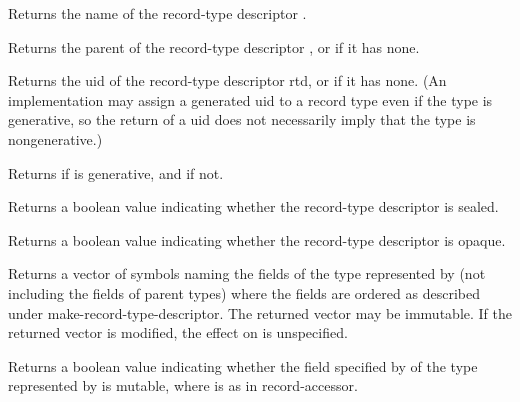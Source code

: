 \begin{entry}{%
}
   
Returns the name of the record-type descriptor .
\end{entry}   

\begin{entry}{%
}
   
Returns the parent of the record-type descriptor , or
\schfalse{} if it has none.
\end{entry}

\begin{entry}{%
}
   
Returns the uid of the record-type descriptor rtd, or \schfalse{} if it has none.
(An implementation may assign a generated uid to a record type even if the
type is generative, so the return of a uid does not necessarily imply that
the type is nongenerative.)
\end{entry}

\begin{entry}{%
}
   
Returns \schtrue{} if  is generative, and \schfalse{} if not.
\end{entry}

\begin{entry}{%
}

Returns a boolean value indicating whether the record-type descriptor is
sealed.
\end{entry}

\begin{entry}{%
}
   
Returns a boolean value indicating whether the record-type descriptor is
opaque.
\end{entry}

\begin{entry}{%
}
   
Returns a vector of symbols naming the fields of the type represented by 
(not including the fields of parent types) where the fields are ordered as
described under {\cf make-record-type-descriptor}.  The returned
vector may be immutable.
If the returned vector is modified, the effect on 
 is unspecified.
\end{entry}

\begin{entry}{%
}
   
Returns a boolean value indicating whether the field specified by
 of the type represented by  is mutable, where 
is as in {\cf record-accessor}.
\end{entry}

